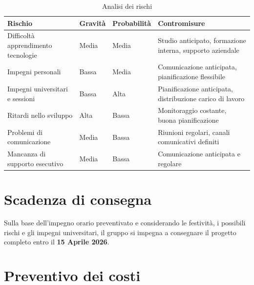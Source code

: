 \documentclass[11pt,a4paper]{article}
\begin{document}
\begin{table}[H]
    \centering
    \begin{tabular}{|p{}|p{}|p{}|p{}|}
        \hline
        \textbf{Rischio} & \textbf{Gravità} & \textbf{Probabilità} & \textbf{Contromisure} \\
        \hline
        \raggedright Difficoltà apprendimento tecnologie & Media & Media & Studio anticipato, formazione interna, supporto aziendale \\
        \hline
        Impegni personali & Bassa & Media & Comunicazione anticipata, pianificazione flessibile \\
        \hline
        \raggedright Impegni universitari e sessioni & Bassa & Alta & Pianificazione anticipata, distribuzione carico di lavoro \\
        \hline
        Ritardi nello sviluppo & Alta & Bassa & Monitoraggio costante, buona pianificazione \\
        \hline
        Problemi di comunicazione & Media & Bassa & Riunioni regolari, canali comunicativi definiti \\
        \hline
        \raggedright Mancanza di supporto esecutivo & Media & Bassa & Comunicazione anticipata e regolare \\
        \hline
    \end{tabular}
    \caption{Analisi dei rischi}
\end{table}

\newpage

\section{Scadenza di consegna}
Sulla base dell'impegno orario preventivato e considerando le festività, i possibili rischi e gli impegni universitari, il gruppo si impegna a consegnare il progetto completo entro il \textbf{15 Aprile 2026}.

\vspace{1cm}

\section{Preventivo dei costi}
\end{document}
